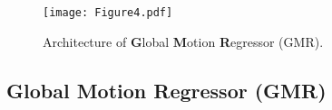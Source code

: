 \documentclass[10pt,twocolumn,letterpaper]{article}
\begin{document}
\begin{figure}[t]
\texttt{[image: Figure4.pdf]}
\vspace*{-6mm}
\caption{Architecture of \textbf{G}lobal \textbf{M}otion \textbf{R}egressor (GMR).}
\label{fig4}
\vspace*{-1mm}
\end{figure}


\subsection{Global Motion Regressor (GMR)}

\end{document}
